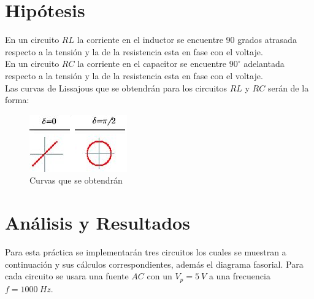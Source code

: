 \documentclass[twocolumn]{IEEEtran}
\begin{document}
\section{Hipótesis}
\noindent
En un circuito $RL$ la corriente en el inductor se encuentre 90 grados atrasada respecto a la tensión y la de la resistencia esta en fase con el voltaje.\\
En un circuito $RC$ la corriente en el capacitor se encuentre $90^\circ$ adelantada respecto a la tensión y la de la resistencia esta en fase con el voltaje.\\
Las curvas de Lissajous que se obtendrán para los circuitos $RL$ y $RC$ serán de la forma:
\begin{figure}[H]
	\centering
		\includegraphics[scale=1]{fig1.png}
	\caption{Curvas que se obtendrán}
	\label{fig1}
\end{figure}

\section{Análisis y Resultados}
\noindent
Para esta práctica se implementarán tres circuitos los cuales  se muestran a continuación y sus cálculos correspondientes, además el diagrama fasorial. Para cada circuito se usara una fuente $AC$ con un $V_p=5\ V$  a una frecuencia $f = 1000\ Hz$.
\end{document}
